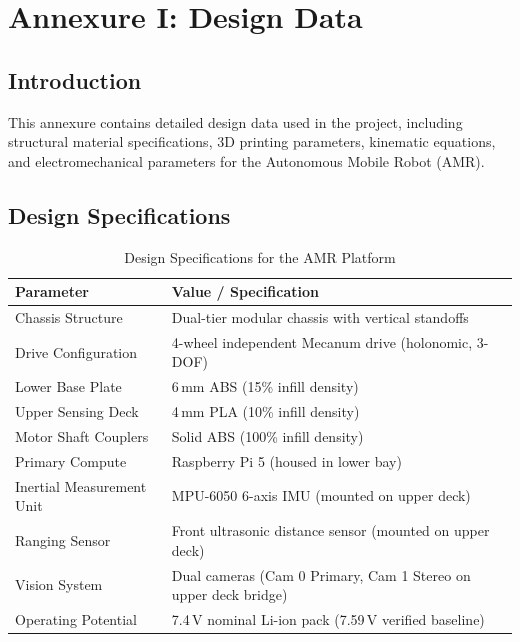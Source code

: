 \chapter*{Annexure I: Design Data}

\renewcommand{\thesection}{I.\arabic{section}}
\renewcommand{\thefigure}{I.\arabic{figure}}
\renewcommand{\thetable}{I.\arabic{table}}
\renewcommand{\theequation}{I.\arabic{equation}}

\setcounter{section}{0}
\setcounter{figure}{0}
\setcounter{table}{0}
\setcounter{equation}{0}

\section{Introduction}
This annexure contains detailed design data used in the project, including structural material specifications, 3D printing parameters, kinematic equations, and electromechanical parameters for the Autonomous Mobile Robot (AMR).

\section*{Design Specifications}
\begin{table}[htbp]
    \centering
    \caption{Design Specifications for the AMR Platform}
    \label{tab:system_design_specs}
    \renewcommand{\arraystretch}{1.3}
    \begin{tabular}{|p{5.5cm}|p{8.5cm}|}
        \hline
        \textbf{Parameter} & \textbf{Value / Specification} \\ \hline
        Chassis Structure & Dual-tier modular chassis with vertical standoffs \\ \hline
        Drive Configuration & 4-wheel independent Mecanum drive (holonomic, 3-DOF) \\ \hline
        Lower Base Plate & 6\,mm ABS (15\% infill density) \\ \hline
        Upper Sensing Deck & 4\,mm PLA (10\% infill density) \\ \hline
        Motor Shaft Couplers & Solid ABS (100\% infill density) \\ \hline
        Primary Compute & Raspberry Pi 5 (housed in lower bay) \\ \hline
        Inertial Measurement Unit & MPU-6050 6-axis IMU (mounted on upper deck) \\ \hline
        Ranging Sensor & Front ultrasonic distance sensor (mounted on upper deck) \\ \hline
        Vision System & Dual cameras (Cam 0 Primary, Cam 1 Stereo on upper deck bridge) \\ \hline
        Operating Potential & 7.4\,V nominal Li-ion pack (7.59\,V verified baseline) \\ \hline
    \end{tabular}
\end{table}

